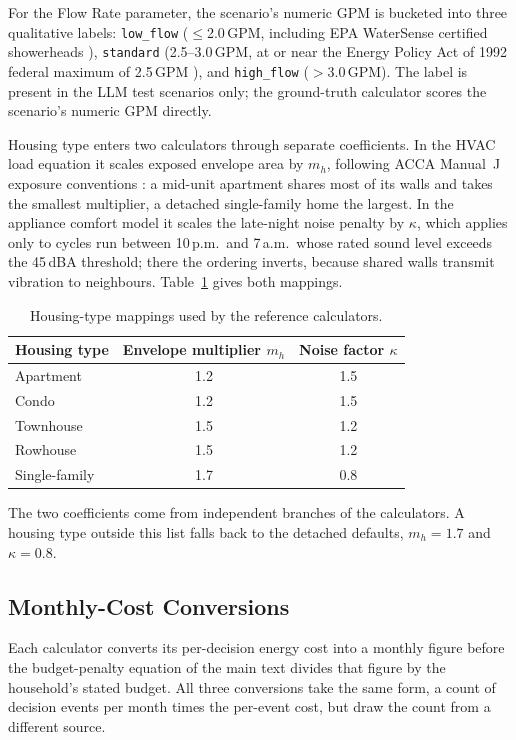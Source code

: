 \documentclass[11pt]{article}
\begin{document}
For the Flow Rate parameter, the scenario's numeric GPM is bucketed into three qualitative labels: \texttt{low\_flow} ($\le$2.0\,GPM, including EPA WaterSense certified showerheads \citep{epawatersense}), \texttt{standard} (2.5--3.0\,GPM, at or near the Energy Policy Act of 1992 federal maximum of 2.5\,GPM \citep{epawatersense}), and \texttt{high\_flow} ($>$3.0\,GPM). The label is present in the LLM test scenarios only; the ground-truth calculator scores the scenario's numeric GPM directly.

Housing type enters two calculators through separate coefficients. In the HVAC load equation it scales exposed envelope area by $m_h$, following ACCA Manual~J exposure conventions \citep{accamanualj}: a mid-unit apartment shares most of its walls and takes the smallest multiplier, a detached single-family home the largest. In the appliance comfort model it scales the late-night noise penalty by $\kappa$, which applies only to cycles run between 10\,p.m.\ and 7\,a.m.\ whose rated sound level exceeds the 45\,dBA threshold; there the ordering inverts, because shared walls transmit vibration to neighbours. Table~\ref{tab:housing_mappings} gives both mappings.

\begin{table}[htbp]
\centering
\caption{Housing-type mappings used by the reference calculators.}
\label{tab:housing_mappings}
\begin{tabular}{@{}lcc@{}}
\toprule
Housing type & Envelope multiplier $m_h$ & Noise factor $\kappa$ \\
\midrule
Apartment     & 1.2 & 1.5 \\
Condo         & 1.2 & 1.5 \\
Townhouse     & 1.5 & 1.2 \\
Rowhouse      & 1.5 & 1.2 \\
Single-family & 1.7 & 0.8 \\
\bottomrule
\end{tabular}
\end{table}

The two coefficients come from independent branches of the calculators. A housing type outside this list falls back to the detached defaults, $m_h = 1.7$ and $\kappa = 0.8$.

\subsection{Monthly-Cost Conversions}
\label{app:monthly_cost}

Each calculator converts its per-decision energy cost into a monthly figure before the budget-penalty equation of the main text divides that figure by the household's stated budget. All three conversions take the same form, a count of decision events per month times the per-event cost, but draw the count from a different source.
\end{document}
